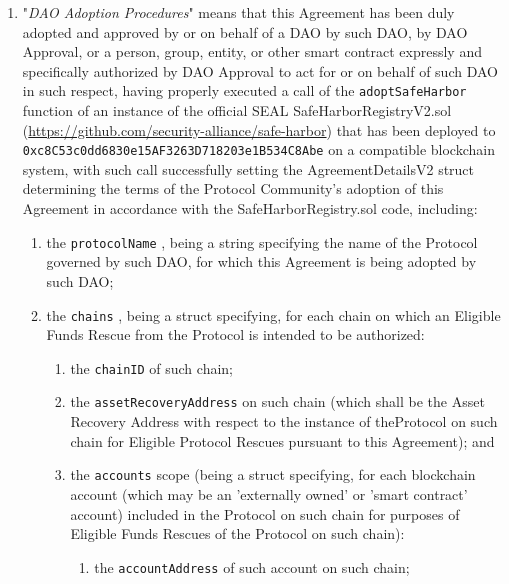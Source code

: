 \documentclass{article}
\newcommand{\code}[1]{%
    \colorbox{red!10}{\textcolor{orange!80!black}{\texttt{#1}}}%
}
\begin{document}
\begin{enumerate}
    \item "\textit{DAO Adoption Procedures}" means that this Agreement has been duly adopted and approved by or on behalf of a DAO by such DAO, by DAO Approval, or a person, group, entity, or other smart contract expressly and specifically authorized by DAO Approval to act for or on behalf of such DAO in such respect, having properly executed a call of the \code{adoptSafeHarbor} function of an instance of the official SEAL SafeHarborRegistryV2.sol (\url{https://github.com/security-alliance/safe-harbor}) that has been deployed to \code{0xc8C53c0dd6830e15AF3263D718203e1B534C8Abe} on a compatible blockchain system, with such call successfully setting the AgreementDetailsV2 struct determining the terms of the Protocol Community's adoption of this Agreement in accordance with the SafeHarborRegistry.sol code, including:

          \begin{enumerate}
              \item the \code{protocolName}, being a string specifying the name of the Protocol governed by such DAO, for which this Agreement is being adopted by such DAO;

              \item the \code{chains}, being a struct specifying, for each chain on which an Eligible Funds Rescue from the Protocol is intended to be authorized:

                    \begin{enumerate}
                        \item the \code{chainID} of such chain;

                        \item the \code{assetRecoveryAddress} on such chain (which shall be the Asset Recovery Address with respect to the instance of theProtocol on such chain for Eligible Protocol Rescues pursuant to this Agreement); and

                        \item the \code{accounts} scope (being a struct specifying, for each blockchain account (which may be an 'externally owned' or 'smart contract' account) included in the Protocol on such chain for purposes of Eligible Funds Rescues of the Protocol on such chain):

                              \begin{enumerate}
                                  \item the \code{accountAddress} of such account on such chain;


\end{enumerate}
\end{enumerate}
\end{enumerate}
\end{enumerate}
\end{document}
